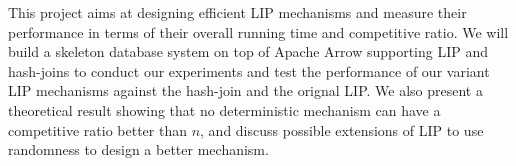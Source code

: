 This project aims at designing efficient LIP mechanisms and measure their performance in terms of their overall running time and competitive ratio. We will build a skeleton database system on top of Apache Arrow supporting LIP and hash-joins to conduct our experiments and test the performance of our variant LIP mechanisms against the hash-join and the orignal LIP. We also present a theoretical result showing that no deterministic mechanism can have a competitive ratio better than $n$, and discuss possible extensions of LIP to use randomness to design a better mechanism.





